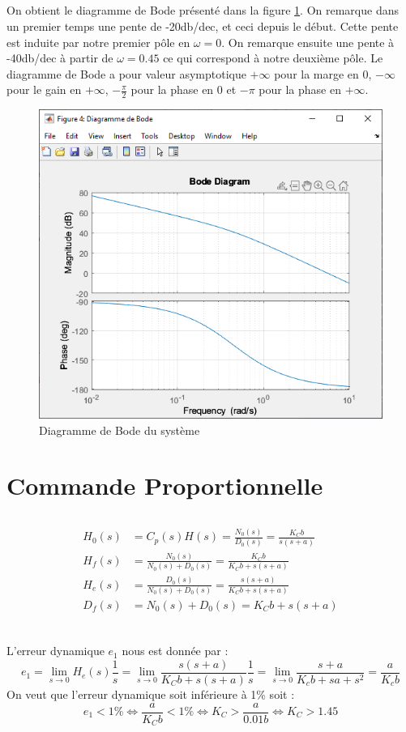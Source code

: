 \documentclass{article}
\begin{document}
\subsection{}
On obtient le diagramme de Bode présenté dans la figure \ref{fig:bode115}.
On remarque dans un premier temps une pente de -20db/dec, et ceci depuis le début. Cette pente est induite par notre premier pôle en $\omega=0$. On remarque ensuite une pente à -40db/dec à partir de $\omega=0.45$ ce qui correspond à notre deuxième pôle. Le diagramme de Bode a pour valeur asymptotique $+\infty$ pour la marge en 0, $-\infty$ pour le gain en $+\infty$, $-\frac{\pi}{2}$ pour la phase en 0 et $-\pi$ pour la phase en $+\infty$.
\begin{figure}[h]
    \centering
    \includegraphics[width=0.5\linewidth]{bode115.PNG}
    \caption{Diagramme de Bode du système}
    \label{fig:bode115}
\end{figure}
\section{Commande Proportionnelle}
\subsection{}
\begin{align*}
    H_0(s)&=C_p(s)H(s)=\frac{N_0(s)}{D_0(s)}=\frac{K_Cb}{s(s+a)}\\
    H_f(s)&=\frac{N_0(s)}{N_0(s)+D_0(s)}=\frac{K_Cb}{K_Cb+s(s+a)}\\
    H_e(s)&=\frac{D_0(s)}{N_0(s)+D_0(s)}=\frac{s(s+a)}{K_Cb+s(s+a)}\\
    D_f(s)&=N_0(s)+D_0(s)=K_Cb+s(s+a)\\
\end{align*}
\subsection{}
L'erreur dynamique $e_1$ nous est donnée par :
\begin{equation*}
    e_1=\lim_{s\rightarrow0}H_e(s)\frac{1}{s}=\lim_{s\rightarrow0}\frac{s(s+a)}{K_Cb+s(s+a)}\frac{1}{s}=\lim_{s\rightarrow0}\frac{s+a}{K_cb+sa+s^2}=\frac{a}{K_cb}
\end{equation*}
On veut que l'erreur dynamique soit inférieure à 1\% soit :
\begin{equation*}
    e_1<1\%\Leftrightarrow\frac{a}{K_Cb}<1\%\Leftrightarrow K_C>\frac{a}{0.01b}\Leftrightarrow K_C>1.45
\end{equation*}
\end{document}
